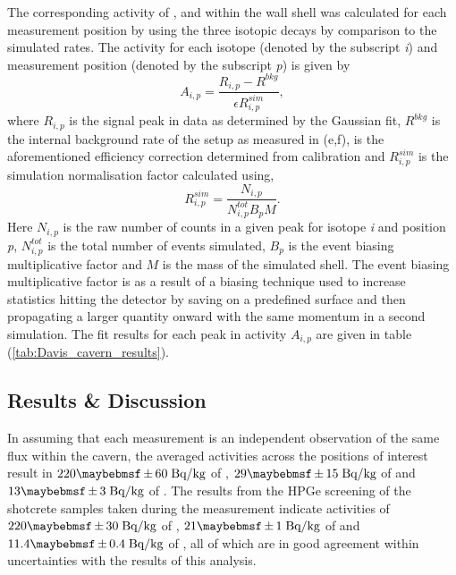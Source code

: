 The corresponding activity of \UTTE{}, \ThTTT{} and \KFZ{} within the wall shell was calculated for each measurement position by using the three isotopic decays by comparison to the simulated rates. The activity for each isotope (denoted by the subscript \textit{i}) and measurement position (denoted by the subscript \textit{p}) is given by
%
\begin{equation}
    A_{i,p} = \frac{R_{i,p} - R^{bkg}}{\epsilon{}R^{sim}_{i,p}},
    \label{eq:resolution_model}
\end{equation}
%
where $R_{i,p}$ is the signal peak in data as determined by the Gaussian fit, $R^{bkg}$ is the internal background rate of the setup as measured in (e,f), \epsilon{} is the aforementioned efficiency correction determined from calibration and $R^{sim}_{i,p}$ is the simulation normalisation factor calculated using,
%
\begin{equation}
    R^{sim}_{i,p} = \frac{N_{i,p}}{N^{tot}_{i,p}B_{p}M}.
    \label{eq:resolution_model}
\end{equation}
%
Here $N_{i,p}$ is the raw number of counts in a given peak for isotope \textit{i} and position \textit{p}, $N^{tot}_{i,p}$ is the total number of events simulated, $B_{p}$ is the event biasing multiplicative factor and $M$ is the mass of the simulated shell. The event biasing multiplicative factor is as a result of a biasing technique used to increase \gray{} statistics hitting the detector by saving \grays{} on a predefined surface and then propagating a larger quantity onward with the same momentum in a second simulation. The fit results for each peak in activity $A_{i,p}$ are given in table (\ref{tab:Davis_cavern_results}).


\subsection{Results \& Discussion}
\label{secsec:results_discussion}

In assuming that each measurement is an independent observation of the same flux within the cavern, the averaged activities across the positions of interest result in $220 \pm 60 \; \MathText{Bq/kg}$ of \KFZ{}, $29 \pm 15 \; \MathText{Bq/kg}$ of \UTTE{} and $13 \pm 3 \; \MathText{Bq/kg}$ of \ThTTT{}. The results from the HPGe screening of the shotcrete samples taken during the measurement indicate activities of $220 \pm 30 \; \MathText{Bq/kg}$ of \KFZ{}, $21 \pm 1 \; \MathText{Bq/kg}$ of \UTTE{} and $11.4 \pm 0.4 \; \MathText{Bq/kg}$ of \ThTTT{}, all of which are in good agreement within uncertainties with the results of this analysis. 

